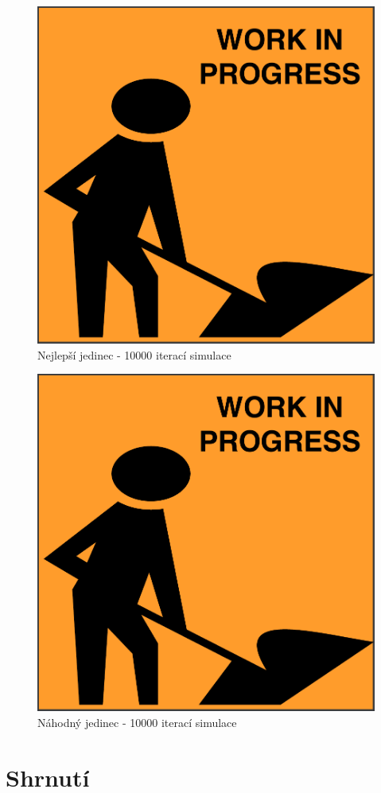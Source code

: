 \begin{figure}[p]\centering
	\includegraphics[width=\columnwidth]{../img/todo}
	\caption{Nejlepší jedinec - 10000 iterací simulace}
	\label{obr04:CompetitiveBestEnd}
\end{figure}
\begin{figure}[p]\centering
	\includegraphics[width=\columnwidth]{../img/todo}
	\caption{Náhodný jedinec - 10000 iterací simulace}
	\label{obr04:CompetitiveRandom end}
\end{figure}
\clearpage
\section{Shrnutí}